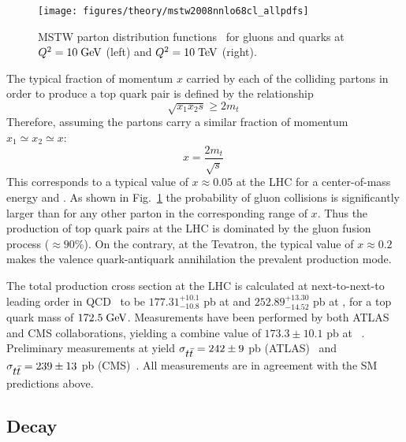 \begin{figure}[!htb]\centering
  \texttt{[image: figures/theory/mstw2008nnlo68cl\_allpdfs]}
  \caption{MSTW parton distribution functions~\cite{ct10} for gluons
    and quarks at $Q^2=10\; \mathrm{GeV}{}$ (left) and $Q^2=10\; \mathrm{TeV}{}$ (right).}
  \label{fig:pdfs}
\end{figure}

The typical fraction of momentum $x$ carried by each of the colliding
partons in order to produce a top quark pair is defined by the
relationship
\begin{equation}
\sqrt{x_1x_2s}\geq{}2m_t\phantom{.}
\end{equation}
Therefore, assuming the partons carry a similar fraction of momentum
$x_1\simeq{}x_2\simeq{}x$:
\begin{equation}
x=\frac{2m_t}{\sqrt{s}}
\phantom{.}
\end{equation}
This corresponds to a typical value of $x\approx{}0.05$ at the LHC for
a center-of-mass energy \seventev{} and \eighttev{}. As shown in
Fig.~\ref{fig:pdfs} the probability of gluon collisions is
significantly larger than for any other parton in the corresponding
range of $x$. Thus the production of top quark pairs at the LHC is
dominated by the gluon fusion process ($\approx{}90\%$). On the
contrary, at the Tevatron, the typical value of $x\approx{}0.2$ makes
the valence quark-antiquark annihilation the prevalent \ttbar{}
production mode.

The total \ttbar{} production cross section at the LHC is calculated
at next-to-next-to leading order in
QCD~\cite{ttxs1,ttxs2,ttxs3,ttxs4,ttxs5,ttxs6,ttxs7} to be
$177.31^{+10.1}_{-10.8}$ pb at \seventev{} and
$252.89^{+13.30}_{-14.52}$ pb at \eighttev{}, for a top quark mass of
$172.5 \; \mathrm{GeV}{}$. Measurements have been performed by both ATLAS and CMS
collaborations, yielding a combine value of $173.3\pm10.1$ pb at
\seventev{}~\cite{ATLAS-CONF-2012-134,CMS-PAS-TOP-12-003}. Preliminary
measurements at \eighttev{} yield $\sigma_{\mbox{$t\bar{t}$}{}}=242\pm{}9$ pb
(ATLAS)~\cite{Aad:2014kva} and $\sigma_{\mbox{$t\bar{t}$}{}}=239\pm{}13$ pb
(CMS)~\cite{Chatrchyan:2013faa}. All measurements are in agreement
with the SM predictions above.

\subsection{Decay}
\label{sec:topdecay}

